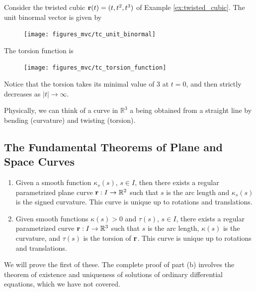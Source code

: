 \documentclass[12pt,letterpaper,reqno]{article}
\numberwithin{equation}{section}
\newcommand{\R}{\ensuremath{\mathbb R}}
\newcommand{\bbr}{{\bf r}}
\begin{document}
{\newpage 

\begin{example}
Consider the twisted cubic $\bbr(t)=(t,t^2,t^3)$ of Example	\ref{ex:twisted_cubic}. The unit binormal vector is given by 

\begin{figure}[h]
	\begin{center}
		\texttt{[image: figures\_mvc/tc\_unit\_binormal]}
	\end{center}
\end{figure}

The torsion function is

\begin{figure}[h]
	\begin{center}
		\texttt{[image: figures\_mvc/tc\_torsion\_function]}
	\end{center}
\end{figure}

Notice that the torsion takes its minimal value of 3 at $t=0$, and then strictly decreases as $|t| \to \infty$.
\end{example}

Physically, we can think of a curve in $\R^3$ a being obtained from a straight line by bending (curvature) and twisting (torsion).

\subsection{The Fundamental Theorems of Plane and Space Curves}

\begin{thm}
	\begin{enumerate}[(1)]
		\item Given a smooth function $\kappa_s(s)$, $s \in I$, then there exists a regular parametrized plane curve $\bbr:I \to \R^2$ such that $s$ is the arc length and $\kappa_s(s)$ is the signed curvature. This curve is unique up to rotations and translations.
		\item Given smooth functions $\kappa(s)>0$ and $\tau(s)$, $s \in I$, there exists a regular parametrized curve $\bbr:I \to \R^3$ such that $s$ is the arc length, $\kappa(s)$ is the curvature, and $\tau(s)$ is the torsion of $\bbr$. This curve is unique up to rotations and translations.
	\end{enumerate}
\end{thm}

We will prove the first of these. The complete proof of part (b) involves the theorem of existence and uniqueness of solutions of ordinary differential equations, which we have not covered. 

}
\end{document}
